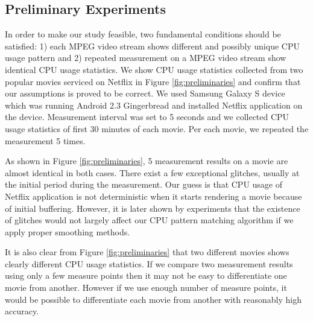 \subsection{Preliminary Experiments}


In order to make our study feasible, two fundamental conditions should be satisfied: 1) each MPEG video stream shows different and possibly unique CPU usage pattern and 2) repeated measurement on a MPEG video stream show identical CPU usage statistics. 
We show CPU usage statistics collected from two popular movies serviced on Netflix in Figure \ref{fig:preliminaries} and confirm that our assumptions is proved to be correct.
We used Samsung Galaxy S device which was running Android 2.3 Gingerbread and installed Netflix application on the device. 
Measurement interval was set to 5 seconds and we collected CPU usage statistics of first 30 minutes of each movie. 
Per each movie, we repeated the measurement 5 times. 

As shown in Figure \ref{fig:preliminaries}, 5 measurement results on a movie are almost identical in both cases. 
There exist a few exceptional glitches, usually at the initial period during the measurement. 
Our guess is that CPU usage of Netflix application is not deterministic when it starts rendering a movie because of initial buffering.
However, it is later shown by experiments that the existence of glitches would not largely affect our CPU pattern matching algorithm if we apply proper smoothing methods. 

It is also clear from Figure \ref{fig:preliminaries} that two different movies shows clearly different CPU usage statistics. 
If we compare two measurement results using only a few measure points then it may not be easy to differentiate one movie from another.
However if we use enough number of measure points, it would be possible to differentiate each movie from another with reasonably high accuracy. 


